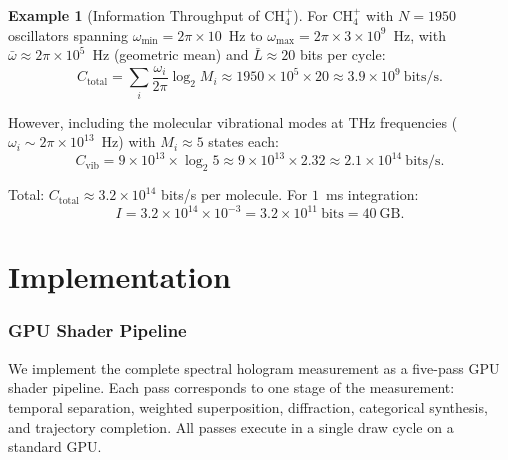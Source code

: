 \documentclass[11pt,a4paper]{article}
\theoremstyle{definition}
\newtheorem{example}[theorem]{Example}
\theoremstyle{remark}
\begin{document}
\begin{example}[Information Throughput of CH$_4^+$]
\label{ex:throughput}
For CH$_4^+$ with $N = 1950$ oscillators spanning $\omega_{\min} = 2\pi \times 10$~Hz to $\omega_{\max} = 2\pi \times 3 \times 10^9$~Hz, with $\bar{\omega} \approx 2\pi \times 10^5$~Hz (geometric mean) and $\bar{L} \approx 20$ bits per cycle:
\begin{equation}
C_{\mathrm{total}} = \sum_i \frac{\omega_i}{2\pi} \log_2 M_i \approx 1950 \times 10^5 \times 20 \approx 3.9 \times 10^9~\mathrm{bits/s}.
\end{equation}

However, including the molecular vibrational modes at THz frequencies ($\omega_i \sim 2\pi \times 10^{13}$~Hz) with $M_i \approx 5$ states each:
\begin{equation}
C_{\mathrm{vib}} = 9 \times 10^{13} \times \log_2 5 \approx 9 \times 10^{13} \times 2.32 \approx 2.1 \times 10^{14}~\mathrm{bits/s}.
\end{equation}

Total: $C_{\mathrm{total}} \approx 3.2 \times 10^{14}$ bits/s per molecule. For $1$~ms integration:
\begin{equation}
I = 3.2 \times 10^{14} \times 10^{-3} = 3.2 \times 10^{11}~\mathrm{bits} = 40~\mathrm{GB}.
\end{equation}
\end{example}


\part{Implementation}

\section{GPU Shader Pipeline}
\label{sec:gpu}

We implement the complete spectral hologram measurement as a five-pass GPU shader pipeline. Each pass corresponds to one stage of the measurement: temporal separation, weighted superposition, diffraction, categorical synthesis, and trajectory completion. All passes execute in a single draw cycle on a standard GPU.
\end{document}
